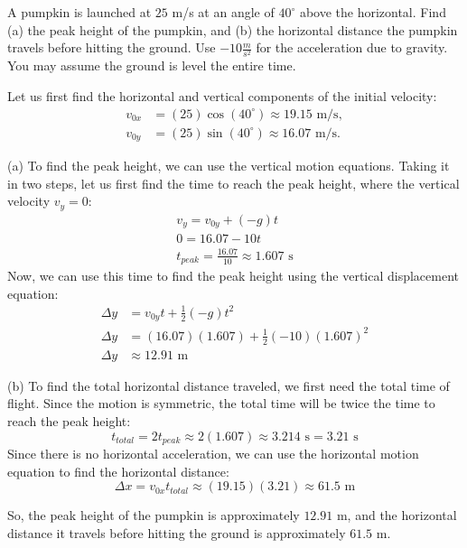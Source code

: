 \begin{Exercise}[title=Projectile Motion at an angle, label=projectiles_angle1]
A pumpkin is launched at $25$ m/s at an angle of $40^\circ$ above the horizontal. Find (a) the peak height of the pumpkin, and (b) the horizontal distance the pumpkin travels before hitting the ground. Use $-10 \frac{m}{s^2}$ for the acceleration due to gravity. You may assume the ground is level the entire time. 
\end{Exercise}
\begin{Answer}[ref=projectiles_angle1]
Let us first find the horizontal and vertical components of the initial velocity:
\begin{align*}
v_{0x} &= (25) \cos(40^\circ) \approx 19.15 \text{ m/s}, \\
v_{0y} &= (25) \sin(40^\circ) \approx 16.07 \text{ m/s}.
\end{align*}

(a) To find the peak height, we can use the vertical motion equations. Taking it in two steps, let us first find the time to reach the peak height, where the vertical velocity $v_y = 0$:
\begin{align*}
    v_y = v_{0y} + (-g) t \\
    0 = 16.07 - 10t \\
    t_{peak} = \frac{16.07}{10} \approx 1.607 \text{ s}
\end{align*}
Now, we can use this time to find the peak height using the vertical displacement equation:
\begin{align*}
    \Delta y &= v_{0y} t + \frac{1}{2} (-g) t^2 \\
    \Delta y &= (16.07)(1.607) + \frac{1}{2} (-10) (1.607)^2 \\
    \Delta y &\approx 12.91 \text{ m}
\end{align*}

(b) To find the total horizontal distance traveled, we first need the total time of flight. Since the motion is symmetric, the total time will be twice the time to reach the peak height:
\[
t_{total} = 2t_{peak} \approx 2(1.607) \approx 3.214 \text{ s} = 3.21 \text{ s}
\]
Since there is no horizontal acceleration, we can use the horizontal motion equation to find the horizontal distance:
\[
\Delta x = v_{0x} t_{total} \approx (19.15)(3.21) \approx 61.5 \text{ m}
\]

So, the peak height of the pumpkin is approximately \(12.91\) m, and the horizontal distance it travels before hitting the ground is approximately \(61.5\) m.
\end{Answer}

